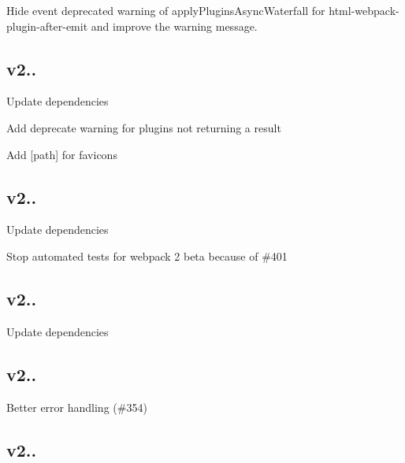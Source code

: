 \begin{DoxyItemize}
\item Hide event deprecated warning of \textquotesingle{}apply\+Plugins\+Async\+Waterfall\textquotesingle{} for html-\/webpack-\/plugin-\/after-\/emit and improve the warning message.
\end{DoxyItemize}

\subsection*{v2.. }


\begin{DoxyItemize}
\item Update dependencies
\item Add deprecate warning for plugins not returning a result
\item Add \mbox{[}path\mbox{]} for favicons
\end{DoxyItemize}

\subsection*{v2.. }


\begin{DoxyItemize}
\item Update dependencies
\item Stop automated tests for webpack 2 beta because of \#401
\end{DoxyItemize}

\subsection*{v2.. }


\begin{DoxyItemize}
\item Update dependencies
\end{DoxyItemize}

\subsection*{v2.. }


\begin{DoxyItemize}
\item Better error handling (\#354)
\end{DoxyItemize}

\subsection*{v2.. }


